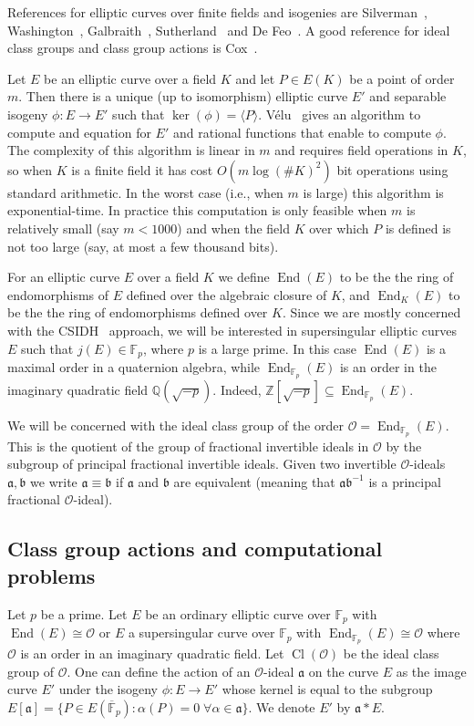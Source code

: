 \documentclass{llncs}
\newcommand{\F}{\mathbb{F}}
\newcommand{\Fpbar}{\overline{\mathbb{F}}_p}
\newcommand{\OO}{\mathcal{O}}
\newcommand{\Q}{\mathbb{Q}}
\newcommand{\Z}{\mathbb{Z}}
\DeclareMathOperator{\End}{End}
\DeclareMathOperator{\Cl}{Cl}
\renewcommand{\a}{\mathfrak{a}}
\renewcommand{\b}{\mathfrak{b}}
\begin{document}
References for elliptic curves over finite fields and isogenies are Silverman~\cite{Sil86}, Washington~\cite{Was08}, Galbraith~\cite{Gal12}, Sutherland~\cite{Sut17} and De Feo~\cite{DF17}.
A good reference for ideal class groups and class group actions is Cox~\cite{Cox}.

Let $E$ be an elliptic curve over a field $K$ and let $P \in E( K )$ be a point of order $m$.
Then there is a unique (up to isomorphism) elliptic curve $E'$ and separable isogeny $\phi : E \to E'$ such that $\ker( \phi ) = \langle P \rangle$.
V{\' e}lu~\cite{velu71} gives an algorithm to compute and equation for $E'$ and rational functions that enable to compute $\phi$.
The complexity of this algorithm is linear in $m$ and requires field operations in $K$, so when $K$ is a finite field it has cost $O( m \log( \#K )^2 )$ bit operations using standard arithmetic.
In the worst case (i.e., when $m$ is large) this algorithm is exponential-time.
In practice this computation is only feasible when $m$ is relatively small (say $m < 1000$) and when the field $K$ over which $P$ is defined is not too large (say, at most a few thousand bits).

For an elliptic curve $E$ over a field $K$ we define $\End(E)$ to be the the ring of endomorphisms of $E$ defined over the algebraic closure of $K$, and $\End_K(E)$ to be the the ring of endomorphisms defined over $K$.
Since we are mostly concerned with the CSIDH~\cite{CLMPR18} approach, we will be interested in supersingular elliptic curves $E$ such that $j(E) \in \F_p$, where $p$ is a large prime.
In this case $\End( E )$ is a maximal order in a quaternion algebra, while $\End_{\F_p}(E)$ is an order in the imaginary quadratic field $\Q( \sqrt{-p} )$.
Indeed, $\Z[ \sqrt{-p} ] \subseteq \End_{\F_p}(E)$.

We will be concerned with the ideal class group of the order $\OO = \End_{\F_p}(E)$.
This is the quotient of the group of fractional invertible ideals in $\OO$ by the subgroup of principal fractional invertible ideals.
Given two invertible $\OO$-ideals $\a, \b$ we write $\a \equiv \b$ if $\a$ and $\b$ are equivalent (meaning that $\a \b^{-1}$ is a principal fractional $\OO$-ideal). 


 

\subsection{Class group actions and computational problems}

Let $p$ be a prime.
Let $E$ be an ordinary elliptic curve over $\F_p$ with $\End(E) \cong \OO$ or $E$ a supersingular curve over $\F_p$ with $\End_{\F_p}(E) \cong \OO$ where $\OO$ is an order in an imaginary quadratic field.
Let $\Cl(\OO )$ be the ideal class group of $\OO$.
One can define the action of an $\OO$-ideal $\a$ on the curve $E$ as the image curve $E'$ under the isogeny $\phi : E \to E'$ whose kernel is equal to the subgroup $E[ \a ] = \{ P \in E( \Fpbar ) : \alpha(P) = 0 \; \forall \alpha \in \a \}$.
We denote $E'$ by $\a * E$.
\end{document}
